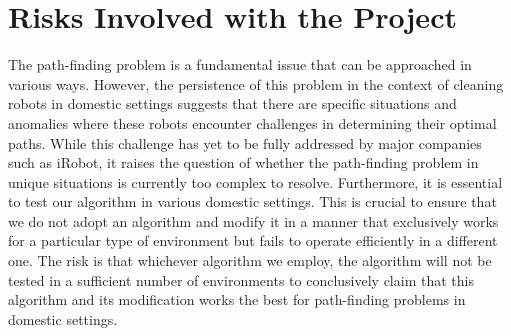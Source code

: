 \documentclass[12pt]{article}
\begin{document}
\section{Risks Involved with the Project}
The path-finding problem is a fundamental issue that can be approached in
various ways. However, the persistence of this problem in the context of
cleaning robots in domestic settings suggests that there are specific
situations and anomalies where these robots encounter challenges in determining
their optimal paths. \newline \newline While this challenge has yet to be fully
addressed by major companies such as iRobot, it raises the question of whether
the path-finding problem in unique situations is currently too complex to
resolve. Furthermore, it is essential to test our algorithm in various domestic
settings. This is crucial to ensure that we do not adopt an algorithm and
modify it in a manner that exclusively works for a particular type of
environment but fails to operate efficiently in a different one. \newline
\newline The risk is that whichever algorithm we employ, the algorithm will not
be tested in a sufficient number of environments to conclusively claim that
this algorithm and its modification works the best for path-finding problems in
domestic settings.
\end{document}

